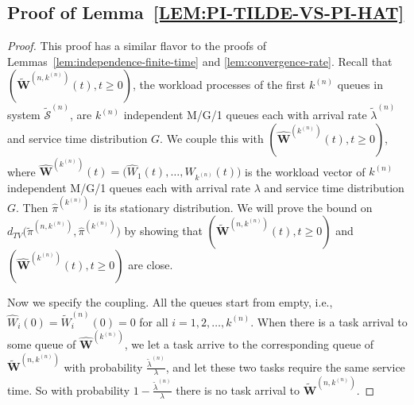 \documentclass[sigconf]{acmart}
\newcommand{\supn}{^{(n)}}
\begin{document}
\subsection*{\normalsize{Proof of Lemma~\ref{LEM:PI-TILDE-VS-PI-HAT}}}
\begin{proof}
This proof has a similar flavor to the proofs of Lemmas~\ref{lem:independence-finite-time} and \ref{lem:convergence-rate}. Recall that $\left(\widetilde{\bm{W}}^{(n,k\supn)}(t),t\ge 0\right)$, the workload processes of the first $k\supn$ queues in system $\widetilde{\mathcal{S}}\supn$, are $k\supn$ independent M/G/1 queues each with arrival rate $\widetilde{\lambda}\supn$ and service time distribution $G$.  We couple this with $\left(\hat{\bm{W}}^{(k\supn)}(t),t\ge 0\right)$, where $\hat{\bm{W}}^{(k\supn)}(t)=\bigl(\hat{W}_1(t),\dots,\hat{W}_{k\supn}(t)\bigr)$ is the workload vector of $k\supn$ independent M/G/1 queues each with arrival rate $\lambda$ and service time distribution $G$. Then $\hat{\pi}^{(k\supn)}$ is its stationary distribution.  We will prove the bound on  $d_{TV}\bigl(\widetilde{\pi}^{(n,k\supn)},\hat{\pi}^{(k\supn)}\bigr)$ by showing that $\left(\widetilde{\bm{W}}^{(n,k\supn)}(t),t\ge 0\right)$ and $\left(\hat{\bm{W}}^{(k\supn)}(t),t\ge 0\right)$ are close.


Now we specify the coupling.  All the queues start from empty, i.e., $\hat{W}_i(0)=\widetilde{W}\supn_i(0)=0$ for all $i=1,2,\dots,k\supn$. When there is a task arrival to some queue of $\hat{\bm{W}}^{(k\supn)}$, we let a task arrive to the corresponding queue of $\widetilde{\bm{W}}^{(n,k\supn)}$ with probability $\frac{\widetilde{\lambda}\supn}{\lambda}$, and let these two tasks require the same service time.  So with probability $1-\frac{\widetilde{\lambda}\supn}{\lambda}$ there is no task arrival to $\widetilde{\bm{W}}^{(n,k\supn)}$.



\end{proof}
\end{document}
